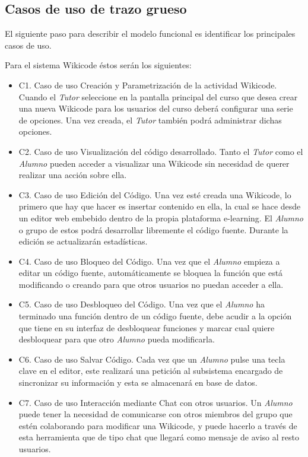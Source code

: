 \subsection{Casos de uso de trazo grueso}

El siguiente paso para describir el modelo funcional es identificar los principales casos de uso.

Para el sistema Wikicode éstos serán los siguientes:

\begin{itemize}
	\item C1. Caso de uso Creación y Parametrización de la actividad Wikicode. Cuando el \emph{Tutor} seleccione en la pantalla principal del curso que desea crear una nueva Wikicode para los usuarios del curso deberá configurar una serie de opciones. Una vez creada, el \emph{Tutor} también podrá administrar dichas opciones.
	\item C2. Caso de uso Visualización del código desarrollado. Tanto el \emph{Tutor} como el \emph{Alumno} pueden acceder a visualizar una Wikicode sin necesidad de querer realizar una acción sobre ella.
	\item C3. Caso de uso Edición del Código. Una vez esté creada una Wikicode, lo primero que hay que hacer es insertar contenido en ella, la cual se hace desde un editor web embebido dentro de la propia plataforma e-learning. El \emph{Alumno} o grupo de estos podrá desarrollar libremente el código fuente. Durante la edición se actualizarán estadísticas.
	\item C4. Caso de uso Bloqueo del Código. Una vez que el \emph{Alumno} empieza a editar un código fuente, automáticamente se bloquea la función que está modificando o creando para que otros usuarios no puedan acceder a ella.
	\item C5. Caso de uso Desbloqueo del Código. Una vez que el \emph{Alumno} ha terminado una función dentro de un código fuente, debe acudir a la opción que tiene en su interfaz de desbloquear funciones y marcar cual quiere desbloquear para que otro \emph{Alumno} pueda modificarla.
	\item C6. Caso de uso Salvar Código. Cada vez que un \emph{Alumno} pulse una tecla clave en el editor, este realizará una petición al subsistema encargado de sincronizar su información y esta se almacenará en base de datos.
	\item C7. Caso de uso Interacción mediante Chat con otros usuarios. Un \emph{Alumno} puede tener la necesidad de comunicarse con otros miembros del grupo que estén colaborando para modificar una Wikicode, y puede hacerlo a través de esta herramienta que de tipo chat que llegará como mensaje de aviso al resto usuarios.

\end{itemize}
